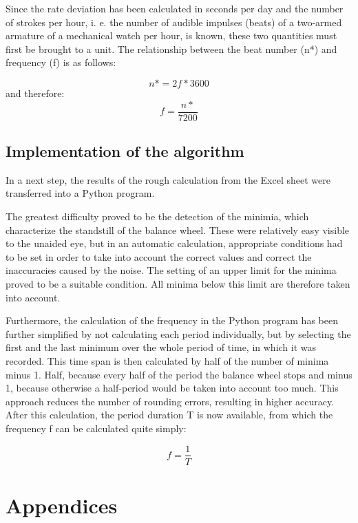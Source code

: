\documentclass[12pt, a4paper]{report}
\begin{document}
Since the rate deviation has been calculated in seconds per day and the number of strokes per hour, i. e. the number of audible impulses (beats) of a two-armed armature of a mechanical watch per hour, is known, these two quantities must first be brought to a unit. The relationship between the beat number (n*) and frequency (f) is as follows: 

\begin{displaymath}
n* = 2f*3600
 \end{displaymath}
 and therefore:
 \begin{displaymath}
  f = \frac{n*}{7200}
 \end{displaymath}
 
 
\section{Implementation of the algorithm}

In a next step, the results of the rough calculation from the Excel sheet were transferred into a Python program. 

The greatest difficulty proved to be the detection of the minimia, which characterize the standstill of the balance wheel. These were relatively easy visible to the unaided eye, but in an automatic calculation, appropriate conditions had to be set in order to take into account the correct values and correct the inaccuracies caused by the noise. The setting of an upper limit for the minima proved to be a suitable condition. All minima below this limit are therefore taken into account. 

Furthermore, the calculation of the frequency in the Python program has been further simplified by not calculating each period individually, but by selecting the first and the last minimum over the whole period of time, in which it was recorded. This time span is then calculated by half of the number of minima minus 1. Half, because every half of the period the balance wheel stops and minus 1, because otherwise a half-period would be taken into account too much. This approach reduces the number of rounding errors, resulting in higher accuracy. After this calculation, the period duration T is now available, from which the frequency f can be calculated quite simply: 

 \begin{displaymath}
  f = \frac{1}{T}
 \end{displaymath}


\pagebreak

\chapter{Appendices}
\end{document}
